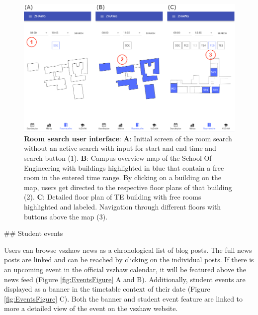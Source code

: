 \begin{markdown}
\bigskip

\begin{figure}[H]
  \includegraphics[width=16cm, center]{./figures/roomsearch_figure1.png}
  \captionsetup{width=15.5cm}
  \caption[Room search user interface]{\textbf{Room search user interface}: \textbf{A}: Initial screen of the room search without an active search with input for start and end time and search button (1). \textbf{B}: Campus overview map of the School Of Engineering with buildings highlighted in blue that contain a free room in the entered time range. By clicking on a building on the map, users get directed to the respective floor plans of that building (2). \textbf{C}: Detailed floor plan of TE building with free rooms highlighted and labeled. Navigation through different floors with buttons above the map (3).}
  \label{fig:RoomSearchFigure}
\end{figure}

\newpage

## Student events

Users can browse vszhaw news as a chronological list of blog posts. The full news posts are linked and can be reached by clicking on the individual posts. If there is an upcoming event in the official vszhaw calendar, it will be featured above the news feed (Figure \ref{fig:EventsFigure} A and B). Additionally, student events are displayed as a banner in the timetable context of their date (Figure \ref{fig:EventsFigure} C). Both the banner and student event feature are linked to more a detailed view of the event on the vszhaw website.

\bigskip


\end{markdown}
